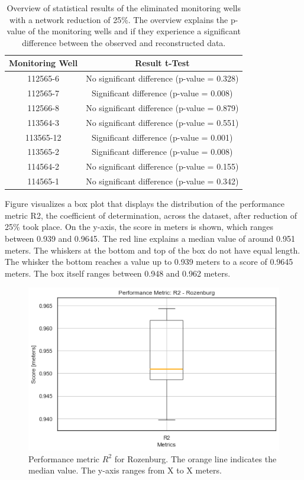 \begin{table}
    \centering
      \caption{Overview of statistical results of the eliminated monitoring wells with a network reduction of 25\%. The overview explains the p-value of the monitoring wells and if they experience a significant difference between the observed and reconstructed data.}
    \begin{tabular}{|c|c|} \hline 
         Monitoring Well& Result t-Test\\ \hline 
         112565-6& No significant difference (p-value = 0.328)\\ \hline 
         112565-7& Significant difference (p-value = 0.008)\\ \hline 
         112566-8& No significant difference (p-value = 0.879)\\ \hline 
         113564-3& No significant difference (p-value = 0.551)\\ \hline 
         113565-12& Significant difference (p-value = 0.001)\\ \hline 
         113565-2& Significant difference (p-value = 0.008)\\ \hline 
         114564-2& No significant difference (p-value = 0.155)\\ \hline 
         114565-1& No significant difference (p-value = 0.342)\\ \hline
    \end{tabular}

    \label{welchroz}
\end{table}

\clearpage
Figure  visualizes a box plot that displays the distribution of the performance metric R2, the coefficient of determination, across the dataset, after reduction of 25\% took place. On the y-axis, the score in meters is shown, which ranges between 0.939 and 0.9645. The red line explains a median value of around 0.951 meters. The whiskers at the bottom and top of the box do not have equal length. The whisker the bottom reaches a value up to 0.939 meters to a score of 0.9645 meters. The box itself ranges between 0.948 and 0.962 meters. 

\begin{figure}[htbp]
    \centering
    \includegraphics[width=0.5\linewidth]{frontmatter/Rozenburg-fig/R2box.png}
    \caption{Performance metric $R^2$ for Rozenburg. 
    The orange line indicates the median value. The y-axis ranges from X to X meters.}
    \label{rozbox}
\end{figure}

